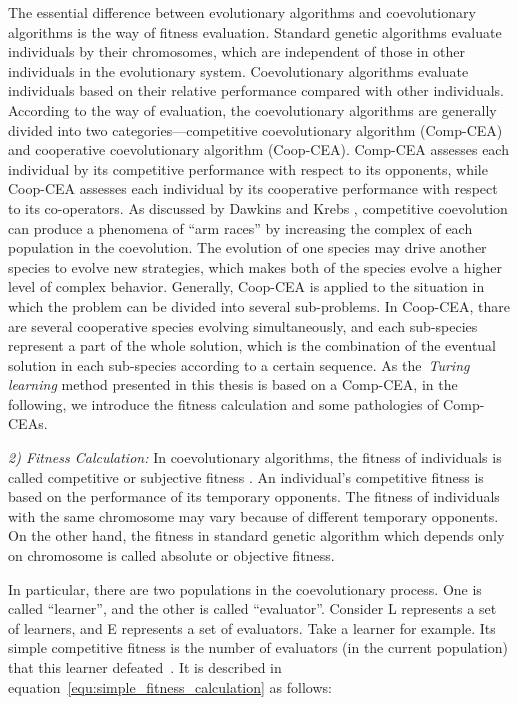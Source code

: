 The essential difference between evolutionary algorithms and coevolutionary algorithms is the way of fitness evaluation. Standard genetic algorithms evaluate individuals by their chromosomes, which are independent of those in other individuals in the evolutionary system. Coevolutionary algorithms evaluate individuals based on their relative performance compared with other individuals. According to the way of evaluation, the coevolutionary algorithms are generally divided into two categories---competitive coevolutionary algorithm (Comp-CEA) and cooperative coevolutionary algorithm (Coop-CEA). Comp-CEA assesses each individual by its competitive performance with respect to its opponents, while Coop-CEA assesses each individual by its cooperative performance with respect to its co-operators. As discussed by Dawkins and Krebs \cite{Dawkins_1979}, competitive coevolution can produce a phenomena of ``arm races'' by increasing the complex of each population in the coevolution. The evolution of one species may drive another species to evolve new strategies, which makes both of the species evolve a higher level of complex behavior. Generally, Coop-CEA is applied to the situation in which the problem can be divided into several sub-problems. In Coop-CEA, thare are several cooperative species evolving simultaneously, and each sub-species represent a part of the whole solution, which is the combination of the eventual solution in each sub-species according to a certain sequence. As the~\textit{Turing learning} method presented in this thesis is based on a Comp-CEA, in the following, we introduce the fitness calculation and some pathologies of Comp-CEAs.

\textit{2) Fitness Calculation:} In coevolutionary algorithms, the fitness of individuals is called competitive or subjective fitness \cite{John_2004}. An individual's competitive fitness is based on the performance of its temporary opponents. The fitness of individuals with the same chromosome may vary because of different temporary opponents. On the other hand, the fitness in standard genetic algorithm which depends only on chromosome is called absolute or objective fitness.

In particular, there are two populations in the coevolutionary process. One is called ``learner'', and the other is called ``evaluator''. Consider L represents a set of learners, and E represents a set of evaluators. Take a learner for example. 
Its simple competitive fitness is the number of evaluators (in the current population) that this learner defeated~\cite{Angeline_1993}. It is described in equation~\eqref{equ:simple_fitness_calculation} as follows:

